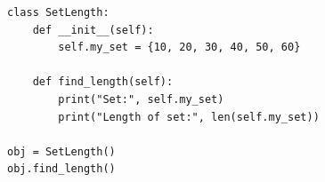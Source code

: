 \begin{verbatim}
class SetLength:
    def __init__(self):
        self.my_set = {10, 20, 30, 40, 50, 60}

    def find_length(self):
        print("Set:", self.my_set)
        print("Length of set:", len(self.my_set))

obj = SetLength()
obj.find_length()
\end{verbatim}